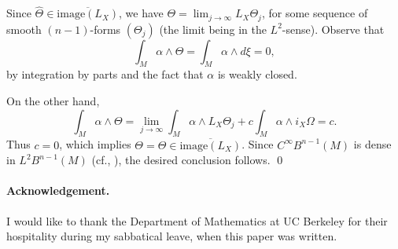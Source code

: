 \documentclass[11pt,letterpaper,reqno,abstract=true]{scrartcl}
\theoremstyle{plain}                              %
\theoremstyle{definition}                         %
\theoremstyle{remark}                             %
\begin{document}
Since $\hat{\Theta} \in \overline{\text{image}(L_X)}$, we have
$\Theta = \lim_{j \to \infty} L_X \Theta_j$, for some sequence of smooth
$(n-1)$-forms $(\Theta_j)$ (the limit being in the $L^2$-sense). Observe
that
%
\begin{displaymath}
  \int_M \alpha \wedge \Theta = \int_M \alpha \wedge d\xi = 0,
\end{displaymath}
%
by integration by parts and the fact that $\alpha$ is weakly closed.

On the other hand,
%
\begin{displaymath}
  \int_M \alpha \wedge \Theta = \lim_{j \to \infty} \int_M \alpha
  \wedge L_X \Theta_j + c \int_M \alpha \wedge i_X \Omega = c.
\end{displaymath}
%
Thus $c = 0$, which implies
$\Theta = \hat{\Theta} \in \overline{\text{image}(L_X)}$. Since
$C^\infty B^{n-1}(M)$ is dense in $L^2 B^{n-1}(M)$ (cf.,
\cite{goldshtein+troyanov+06}), the desired conclusion follows. \qed





\paragraph{Acknowledgement.} I would like to thank the
Department of Mathematics at UC Berkeley for their hospitality during
my sabbatical leave, when this paper was written.






\end{document}
